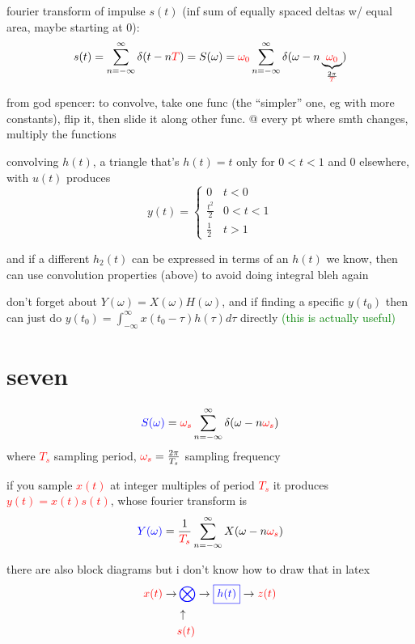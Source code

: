 \documentclass[a5paper, fleqn]{article}
\newcommand{\emf}[1]{\textcolor{red}{#1}}
\newcommand{\note}[1]{\textcolor{green}{#1}}
\newcommand{\eq}[1]{\textcolor{red}{$#1$}}
\newcommand{\wrap}{\hangpara{0.5cm}{1}}
\begin{document}
\wrap fourier transform of impulse $s(t)$ (inf sum of equally spaced deltas w/ equal area, maybe starting at 0):
\[s(t) = \sum_{n = -\infty}^\infty \delta(t - n\emf{T}) = S(\omega) = \emf{\omega_0} \sum_{n = -\infty}^\infty \delta(\omega - n\underbrace{\emf{\omega_0}}_{\frac{2\pi}{\emf{T}}})\]

\wrap from god spencer: to convolve, take one func (the ``simpler'' one, eg with more constants), flip it, then slide it along other func. @ every pt where smth changes, multiply the functions

\wrap convolving $h(t)$, a triangle that's $h(t) = t$ only for $0 < t < 1$ and 0 elsewhere, with $u(t)$ produces
\[y(t) = \begin{cases}
    0             & t < 0     \\
    \frac{t^2}{2} & 0 < t < 1 \\
    \frac{1}{2}   & t > 1
  \end{cases}\]

\wrap and if a different $h_2(t)$ can be expressed in terms of an $h(t)$ we know, then can use convolution properties (above) to avoid doing integral bleh again

\wrap don't forget about $Y(\omega) = X(\omega) H(\omega)$, and if finding a specific $y(t_0)$ then can just do $y(t_0) = \int_{-\infty}^\infty x(t_0 - \tau) h(\tau) d\tau$ directly \note{(this is actually useful)}

\section*{\textcolor{primary}{seven}}

\[\textcolor{blue}{S(\omega)} = \emf{\omega_s} \sum_{n = -\infty}^\infty \delta(\omega - n\emf{\omega_s})\]
where \eq{T_s} sampling period, $\emf{\omega_s} = \frac{2\pi}{T_s}$ sampling frequency

if you sample \eq{x(t)} at integer multiples of period \eq{T_s} it produces \eq{y(t) = x(t) s(t)}, whose fourier transform is
\[\textcolor{blue}{Y(\omega)} = \frac{1}{\emf{T_s}} \sum_{n = -\infty}^\infty X(\omega - n\emf{\omega_s})\]

there are also block diagrams but i don't know how to draw that in latex
\begin{align*}
  \emf{x(t)} \to & \,\textcolor{blue}{\bigotimes} \to \textcolor{blue}{\boxed{h(t)}} \to \emf{z(t)} \\
                 & \uparrow                                                                         \\
                 & \emf{s(t)}
\end{align*}
\end{document}
